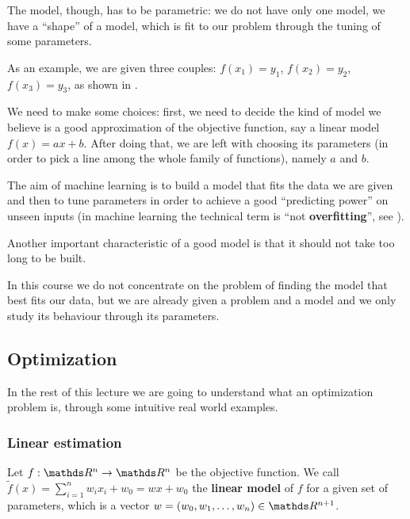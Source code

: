 \documentclass[computationalMathematics.tex]{subfiles}
\begin{document}
The model, though, has to be parametric: we do not have only one model, we have a ``shape'' of a model, which is fit to our problem through the tuning of some parameters.

\begin{example}
  As an example, we are given three couples: $f(x_1) = y_1$, $f(x_2) = y_2$, $f(x_3) = y_3$, as shown in .


We need to make some choices: first, we need to decide the kind of model we believe is a good approximation of the objective function, say a linear model $f(x) = ax + b$.
  After doing that, we are left with choosing its parameters (in order to pick a line among the whole family of functions), namely $a$ and $b$.
\end{example}

The aim of machine learning is to build a model that fits the data we are given and then to tune parameters in order to achieve a good ``predicting power'' on unseen inputs (in machine learning the technical term is ``not \textbf{overfitting}'', see ).

Another important characteristic of a good model is that it should not take too long to be built.

In this course we do not concentrate on the problem of finding the model that best fits our data, but we are already given a problem and a model and we only study its behaviour through its parameters.

\subsection{Optimization}

In the rest of this lecture we are going to understand what an optimization problem is, through some intuitive real world examples.

\subsubsection{Linear estimation}
\begin{definition}
  Let $f: \R^n \to \R^n$ be the objective function. We call $\widetilde{f}(x) = \sum_{i = 1}^n w_i x_i + w_0 = w x + w_0$ the \textbf{linear model} of $f$ for a given set of parameters, which is a vector $w = (w_0, w_1, \ldots, w_n) \in \R^{n+1}$.
\end{definition}
\end{document}
